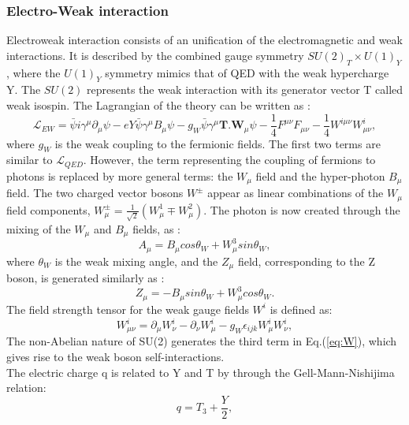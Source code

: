 \subsubsection{Electro-Weak interaction}
Electroweak interaction consists of an unification of the electromagnetic and weak interactions. It is described by the combined gauge symmetry $SU(2)_{T}\times U(1)_{Y}$, where the $U(1)_{Y}$ symmetry mimics that of QED with the weak hypercharge Y. The $SU(2)$ represents the weak interaction with its generator vector T called weak isospin. The Lagrangian of the theory can be written as : 
\begin{equation}
    \mathcal{L}_{EW} = \bar{\psi}i\gamma^\mu\partial_\mu\psi -eY\bar{\psi}\gamma^{\mu}B_{\mu}\psi-g_{W}\bar{\psi}\gamma^{\mu}\textbf{T.W$_\mu$}\psi
    -\frac{1}{4}F^{\mu\nu}F_{\mu\nu} - \frac{1}{4}W^{i\mu\nu}W^i_{\mu\nu},
\end{equation}
where $g_{W}$ is the weak coupling to the fermionic fields. The first two terms are similar to $\mathcal{L}_{QED}$. However, the term representing the coupling of fermions to photons is replaced by more general terms: the $W_{\mu}$ field and the hyper-photon $B_{\mu}$ field. The two charged vector bosons $W^\pm$ appear as linear combinations of the $W_{\mu}$ field components, $W^{\pm}_{\mu} = \frac{1}{\sqrt{2}}(W^1_{\mu}\mp W^2_{\mu})$. The photon is now created through the mixing of the $W_{\mu}$ and $B_{\mu}$ fields, as :
\begin{equation}
    A_{\mu} = B_{\mu}cos\theta_{W} + W^3_{\mu}sin\theta_{W},
\end{equation}
where $\theta_{W}$ is the weak mixing angle, and the $Z_{\mu}$ field, corresponding to the Z boson, is generated similarly as : 
\begin{equation}
     Z_{\mu} = -B_{\mu}sin\theta_{W} + W^3_{\mu}cos\theta_{W}.
\end{equation}
The field strength tensor for the weak gauge fields $W^i$ is defined as:
\begin{equation}
    W^{i}_{\mu\nu} = \partial_{\mu}W^i_{\nu} - \partial_{\nu}W^i_{\mu} - g_{W}\epsilon_{ijk}W^i_{\mu}W^i_{\nu},
    \label{eq:W}
\end{equation}
The non-Abelian nature of SU(2) generates the third term in Eq.(\ref{eq:W}), which gives rise to the weak boson self-interactions. \\
The electric charge q is related to Y and T by through the Gell-Mann-Nishijima relation:
\begin{equation}
    q = T_3 + \frac{Y}{2},
\end{equation}
